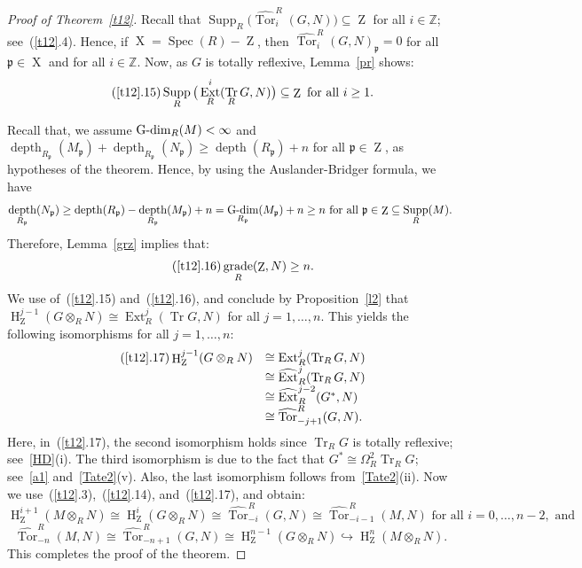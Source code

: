 \documentclass[11pt]{amsart}
\theoremstyle{definition}
\theoremstyle{definition}
\numberwithin{equation}{section}
\newcommand{\fp}{\mathfrak{p}}
\newcommand{\ZZ}{\mathbb{Z}}
\DeclareMathOperator{\Gdim}{\textnormal{G-dim}}
\DeclareMathOperator{\gr}{\textnormal{grade}}
\DeclareMathOperator{\Tr}{Tr}
\DeclareMathOperator{\X}{X}
\DeclareMathOperator{\mz}{Z}
\DeclareMathOperator{\depth}{depth}
\DeclareMathOperator{\Ext}{Ext}
\DeclareMathOperator{\hh}{H}
\DeclareMathOperator{\Supp}{Supp}
\DeclareMathOperator{\Spec}{Spec}
\DeclareMathOperator{\Tor}{Tor}
\begin{document}
\begin{proof}[Proof of Theorem~\ref{t12}]
Recall that $\Supp_R\big(\widehat{\Tor}^R_i(G,N)\big)\subseteq\mz$ for all $i\in\ZZ$; see~(\ref{t12}.4). Hence, if $\X=\Spec(R)-\mz$, then $\widehat{\Tor}^R_i(G,N)_{\fp}=0$ for all $\fp\in\X$ and for all $i\in\ZZ$. Now, as $G$ is totally reflexive, Lemma~\ref{pr} shows:
\begin{equation}\tag{\ref{t12}.15}
\Supp_R\big(\Ext^i_R(\Tr_R G,N)\big)\subseteq\mz \text{ for all } i\geq 1. 
\end{equation}

Recall that, we assume $\Gdim_R(M)<\infty$ and $\depth_{R_\fp}(M_\fp)+\depth_{R_\fp}(N_\fp) \geq \depth(R_{\fp})+n$ for all $\fp \in \mz$, as hypotheses of the theorem. Hence, by using the Auslander-Bridger formula, we have
$$\depth_{R_\fp}(N_\fp)\geq \depth(R_{\fp})-\depth_{R_\fp}(M_\fp)+n = \Gdim_{R_\fp}(M_\fp)+n\geq n \text{ for all } \fp\in\mz\subseteq\Supp_R(M).$$
Therefore, Lemma~\ref{grz} implies that:
\begin{equation}\tag{\ref{t12}.16}
\gr_R(\mz,N)\geq n. 
\end{equation}
We use of~(\ref{t12}.15) and~(\ref{t12}.16), and conclude by Proposition~\ref{l2} that $\hh^{j-1}_{\mz}(G\otimes_RN)\cong\Ext^j_R(\Tr G,N)$ for all $j=1, \ldots, n$. This yields the following isomorphisms for all $j=1, \ldots, n$:
\[\begin{array}{rl}\tag{\ref{t12}.17}
\hh^{j-1}_{\mz}(G\otimes_RN)&\cong\Ext^j_R(\Tr_R G,N)\\
&\cong\widehat{\Ext}^j_R(\Tr_R G,N)\\
&\cong\widehat{\Ext}^{j-2}_R(G^{\ast},N)\\
&\cong\widehat{\Tor}_{-j+1}^R(G,N).
\end{array}\]
Here, in~(\ref{t12}.17), the second isomorphism holds since $\Tr_R G$ is totally reflexive; see~\ref{HD}(i). The third isomorphism is due to the fact that $G^{\ast} \cong \Omega^2_R \Tr_R G$; see~\ref{a1} and~\ref{Tate2}(v). Also, the last isomorphism follows from~\ref{Tate2}(ii). Now we use~(\ref{t12}.3),~(\ref{t12}.14), and~(\ref{t12}.17), and obtain:
$$\hh^{i+1}_{\mz}(M\otimes_RN)\cong \hh^{i}_{\mz}(G\otimes_RN) \cong \widehat{\Tor}_{-i}^R(G,N)\cong \widehat{\Tor}_{-i-1}^R(M,N) \text{ for all } i=0, \ldots, n-2, \text{ and } $$
$$\widehat{\Tor}_{-n}^R(M,N) \cong \widehat{\Tor}_{-n+1}^R(G,N) \cong \hh^{n-1}_{\mz}(G\otimes_RN)\hookrightarrow \hh^{n}_{\mz}(M\otimes_RN).$$
This completes the proof of the theorem.
\end{proof}

\end{document}
